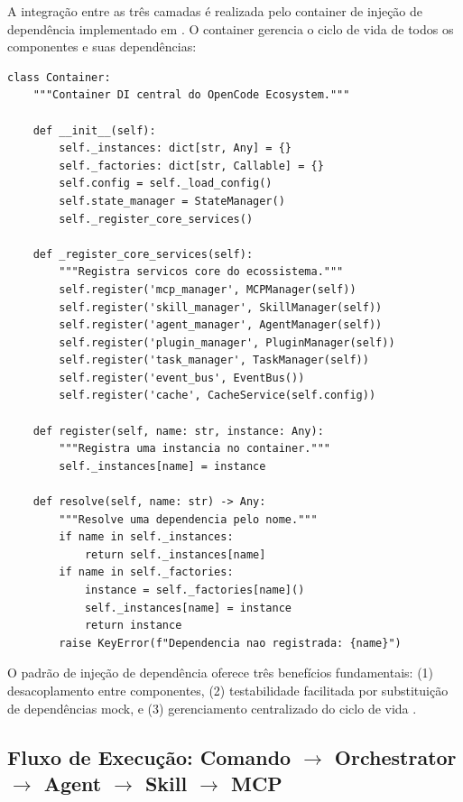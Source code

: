 A integração entre as três camadas é realizada pelo container de injeção
de dependência implementado em 
\cite{fowler2019refactoring}. O container gerencia o ciclo de vida de
todos os componentes e suas dependências:

\begin{lstlisting}[style=pythonstyle, caption={Container de injecao de dependencia},
                   label={lst:container}]
class Container:
    """Container DI central do OpenCode Ecosystem."""

    def __init__(self):
        self._instances: dict[str, Any] = {}
        self._factories: dict[str, Callable] = {}
        self.config = self._load_config()
        self.state_manager = StateManager()
        self._register_core_services()

    def _register_core_services(self):
        """Registra servicos core do ecossistema."""
        self.register('mcp_manager', MCPManager(self))
        self.register('skill_manager', SkillManager(self))
        self.register('agent_manager', AgentManager(self))
        self.register('plugin_manager', PluginManager(self))
        self.register('task_manager', TaskManager(self))
        self.register('event_bus', EventBus())
        self.register('cache', CacheService(self.config))

    def register(self, name: str, instance: Any):
        """Registra uma instancia no container."""
        self._instances[name] = instance

    def resolve(self, name: str) -> Any:
        """Resolve uma dependencia pelo nome."""
        if name in self._instances:
            return self._instances[name]
        if name in self._factories:
            instance = self._factories[name]()
            self._instances[name] = instance
            return instance
        raise KeyError(f"Dependencia nao registrada: {name}")
\end{lstlisting}

O padrão de injeção de dependência oferece três benefícios fundamentais:
(1) desacoplamento entre componentes, (2) testabilidade facilitada por
substituição de dependências mock, e (3) gerenciamento centralizado do
ciclo de vida \cite{fowler2019refactoring}.

\subsection{Fluxo de Execução: Comando $\to$ Orchestrator $\to$ Agent $\to$ Skill $\to$ MCP}
\label{subsec:fluxo-execucao}

